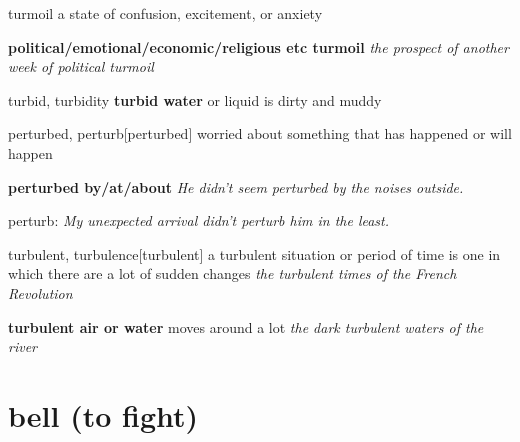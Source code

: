 \begin{DefWord}{turmoil}
    a state of confusion, excitement, or anxiety

    \textbf{political/emotional/economic/religious etc turmoil}
    \textit{the prospect of another week of political turmoil}

\end{DefWord}

\begin{DefWord}{turbid, turbidity}
    \textbf{turbid water} or liquid is dirty and muddy


\end{DefWord}

\begin{DefWord}{perturbed, perturb}[perturbed]
    worried about something that has happened or will happen

    \textbf{perturbed by/at/about}
    \textit{ He didn't seem perturbed by the noises outside.}

    perturb: \textit{My unexpected arrival didn't perturb him in the least.}
\end{DefWord}

\begin{DefWord}{turbulent, turbulence}[turbulent]
    a turbulent situation or period of time is one in which there are a lot of sudden changes
    \textit{the turbulent times of the French Revolution}

    \textbf{turbulent air or water} moves around a lot
    \textit{ the dark turbulent waters of the river}
\end{DefWord}

\section{bell (to fight)}

